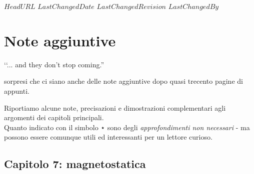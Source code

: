 \svnidlong
{$HeadURL$}
{$LastChangedDate$}
{$LastChangedRevision$}
{$LastChangedBy$}

\chapter{Note aggiuntive}
\begin{introduction}
‘‘... and they don't stop coming.''
\begin{flushright}
	 sorpresi che ci siano anche delle note aggiuntive dopo quasi trecento pagine di appunti.
\end{flushright}
\end{introduction}

\noindent Riportiamo alcune note, precisazioni e dimostrazioni complementari agli argomenti dei capitoli principali.\\
Quanto indicato con il simbolo ⋆ sono degli \textit{approfondimenti non necessari} - ma possono essere comunque utili ed interessanti per un lettore curioso.
\section{Capitolo 7: magnetostatica}
